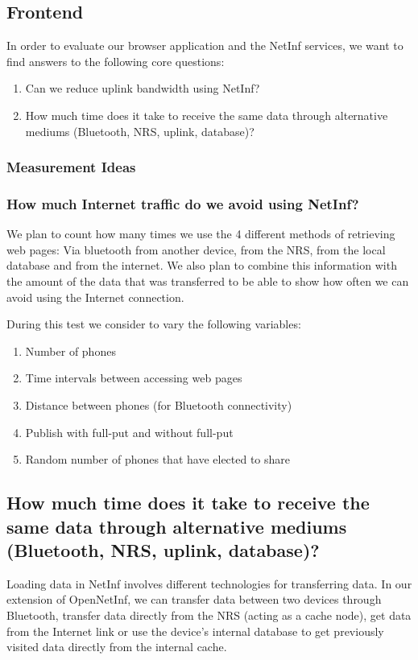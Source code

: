 \subsection{Frontend}
In order to evaluate our browser application and the NetInf services, we want to find answers to the following core questions:

\begin{enumerate}
\item Can we reduce uplink bandwidth using NetInf?
\item How much time does it take to receive the same data through alternative mediums (Bluetooth, NRS, uplink, database)?
\end{enumerate}

\subsubsection{Measurement Ideas}
\subsubsection{How much Internet traffic do we avoid using NetInf?}
We plan to count how many times we use the 4 different methods of retrieving web pages: Via bluetooth from another device, from the NRS, from the local database and from the internet.
We also plan to combine this information with the amount of the data that was transferred to be able to show how often we can avoid using the Internet connection.

During this test we consider to vary the following variables:

\begin{enumerate}
\item Number of phones
\item Time intervals between accessing web pages
\item Distance between phones (for Bluetooth connectivity)
\item Publish with full-put and without full-put
\item Random number of phones that have elected to share
\end{enumerate}

\subsection{How much time does it take to receive the same data through alternative mediums (Bluetooth, NRS, uplink, database)?}

Loading data in NetInf involves different technologies for transferring data. In our extension of OpenNetInf, we can transfer data between two devices through Bluetooth, transfer data directly from the NRS (acting as a cache node), get data from the Internet link or use the device's internal database to get previously visited data directly from the internal cache.

